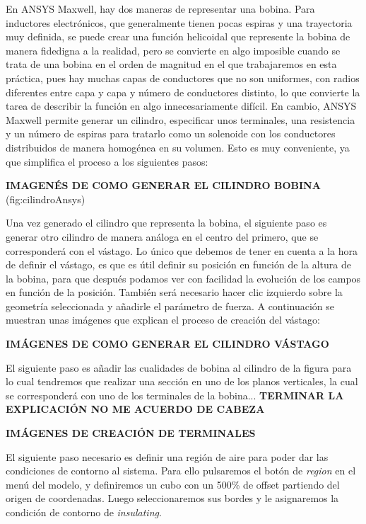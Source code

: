 En ANSYS Maxwell\textsuperscript{\textregistered}, hay dos maneras de representar una bobina. Para inductores electrónicos, que generalmente tienen pocas espiras y una trayectoria muy definida, se puede crear una función helicoidal que represente la bobina de manera fidedigna a la realidad, pero se convierte en algo imposible cuando se trata de una bobina en el orden de magnitud en el que trabajaremos en esta práctica, pues hay muchas capas de conductores que no son uniformes, con radios diferentes entre capa y capa y número de conductores distinto, lo que convierte la tarea de describir la función en algo innecesariamente difícil. En cambio, ANSYS Maxwell\textsuperscript{\textregistered} permite generar un cilindro, especificar unos terminales, una resistencia y un número de espiras para tratarlo como un solenoide con los conductores distribuidos de manera homogénea en su volumen. Esto es muy conveniente, ya que simplifica el proceso a los siguientes pasos:

\textbf{IMAGENÉS DE COMO GENERAR EL CILINDRO BOBINA} (fig:cilindroAnsys)

Una vez generado el cilindro que representa la bobina, el siguiente paso es generar otro cilindro de manera análoga en el centro del primero, que se corresponderá con el vástago. Lo único que debemos de tener en cuenta a la hora de definir el vástago, es que es útil definir su posición en función de la altura de la bobina, para que después podamos ver con facilidad la evolución de los campos en función de la posición. También será necesario hacer clic izquierdo sobre la geometría seleccionada y añadirle el parámetro de fuerza. A continuación se muestran unas imágenes que explican el proceso de creación del vástago:

\textbf{IMÁGENES DE COMO GENERAR EL CILINDRO VÁSTAGO}

El siguiente paso es añadir las cualidades de bobina al cilindro de la figura %
para lo cual tendremos que realizar una sección en uno de los planos verticales, la cual se corresponderá con uno de los terminales de la bobina... \textbf{TERMINAR LA EXPLICACIÓN NO ME ACUERDO DE CABEZA}

\textbf{IMÁGENES DE CREACIÓN DE TERMINALES}

El siguiente paso necesario es definir una región de aire para poder dar las condiciones de contorno al sistema. Para ello pulsaremos el botón de \textit{region} en el menú del modelo, y definiremos un cubo con un 500\% de offset partiendo del origen de coordenadas. Luego seleccionaremos sus bordes y le asignaremos la condición de contorno de \textit{insulating}.

